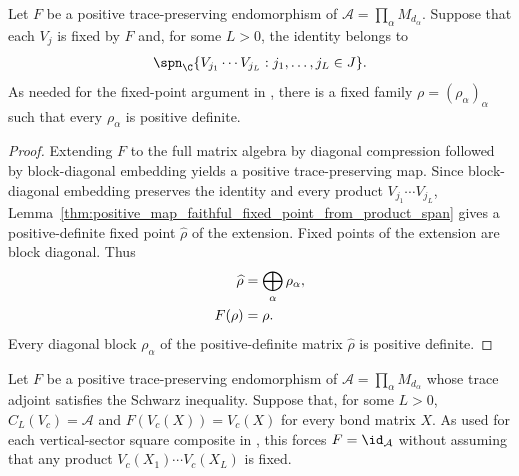 \begin{lemma}
    \label{thm:mpdo_direct_sum_faithful_fixed_family}
    \leanok
    Let $F$ be a positive trace-preserving endomorphism of
    $\mathcal A=\prod_\alpha M_{d_\alpha}$. Suppose that each $V_j$ is
    fixed by $F$ and, for some $L>0$, the identity belongs to
    \begin{align}
        \spn_{\C}
        \{V_{j_1}\cdots V_{j_L}:j_1,\ldots,j_L\in J\}.
        \notag
    \end{align}
    As needed for the fixed-point argument in
    \cite[Appendix~C.4, lines~1980--1993]{Cirac2016MPDO_arXiv}, there is a
    fixed family $\rho=(\rho_\alpha)_\alpha$ such that every $\rho_\alpha$
    is positive definite.
\end{lemma}

\begin{proof}\leanok
    Extending $F$ to the full matrix algebra by diagonal compression followed
    by block-diagonal embedding yields a positive trace-preserving map. Since
    block-diagonal embedding preserves the identity and every product
    $V_{j_1}\cdots V_{j_L}$,
    Lemma~\ref{thm:positive_map_faithful_fixed_point_from_product_span}
    gives a positive-definite fixed point $\widehat\rho$ of the extension.
    Fixed points of the extension are block diagonal. Thus
    \begin{align}
        \widehat\rho
         & =\bigoplus_\alpha\rho_\alpha,
        \notag                           \\
        F(\rho)
         & =\rho.
        \notag
    \end{align}
    Every diagonal block $\rho_\alpha$ of the positive-definite matrix
    $\widehat\rho$ is positive definite.
\end{proof}

\begin{lemma}
    \label{thm:mpdo_fixed_contractions_trace_adjoint_schwarz_identity}
    \leanok
    Let $F$ be a positive trace-preserving endomorphism of
    $\mathcal A=\prod_\alpha M_{d_\alpha}$ whose trace adjoint satisfies the
    Schwarz inequality. Suppose that, for some $L>0$,
    $C_L(V_c)=\mathcal A$ and $F(V_c(X))=V_c(X)$ for every bond matrix $X$.
    As used for each vertical-sector square composite in
    \cite[Appendix~C.4, lines~1980--1995]{Cirac2016MPDO_arXiv}, this forces
    $F=\id_{\mathcal A}$ without assuming that any product
    $V_c(X_1)\cdots V_c(X_L)$ is fixed.
\end{lemma}

